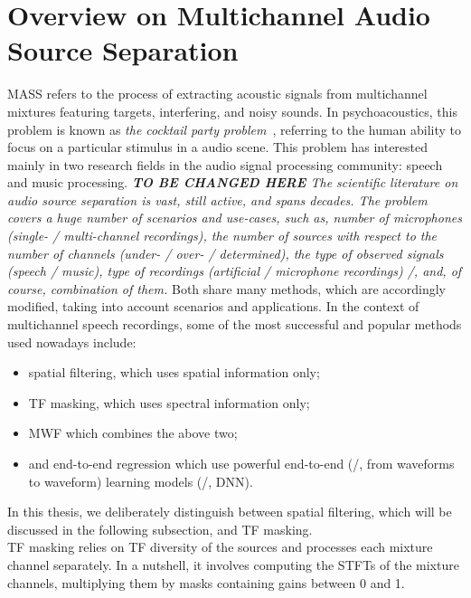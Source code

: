 \section{Overview on Multichannel Audio Source Separation}\label{sec:application:separation}
\acf{MASS} refers to the process of extracting acoustic signals from multichannel mixtures featuring targets, interfering, and noisy sounds.
In psychoacoustics, this problem is known as \textit{the cocktail party problem}~, referring to the human ability to focus on a particular stimulus in a audio scene.
This problem has interested mainly in two research fields in the audio signal processing community: speech and music processing.
\textit{
    \textbf{TO BE CHANGED HERE}
    The scientific literature on audio source separation is vast, still active, and spans decades.
    The problem covers a huge number of scenarios and use-cases, such as, number of microphones (single- \vs/ multi-channel recordings), the number of sources with respect to the number of channels (under- \vs/ over- \vs/ determined), the type of observed signals (speech \vs/ music), type of recordings (artificial \vs/ microphone recordings) \etc/, and, of course, combination of them.
}
Both share many methods, which are accordingly modified, taking into account scenarios and applications.
In the context of multichannel speech recordings, some of the most successful and popular methods used nowadays
include:
\begin{itemize}
    \item spatial filtering, which uses spatial information only;
    \item \ac{TF} masking, which uses spectral information only;
    \item \ac{MWF} which combines the above two;
    \item and end-to-end regression which use powerful end-to-end (\ie/, from waveforms to waveform) learning models (\eg/, \ac{DNN}).
\end{itemize}
In this thesis, we deliberately distinguish between spatial filtering, which will be discussed in the following subsection, and \ac{TF} masking.
\\\ac{TF} masking relies on \ac{TF} diversity of the sources and processes each mixture channel separately.
In a nutshell, it involves computing the \acp{STFT} of the mixture channels, multiplying them by masks containing gains between 0 and 1.
